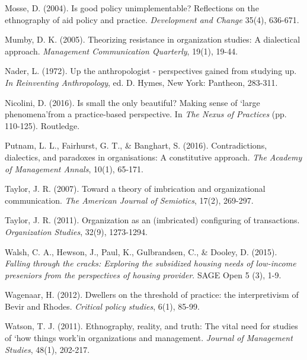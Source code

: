 \begin{thebibliography}{99}
\item Mosse, D. (2004). Is good policy unimplementable? Reflections on the ethnography of aid policy and practice. \textit{Development and Change} 35(4), 636-671.
\item Mumby, D. K. (2005). Theorizing resistance in organization studies: A dialectical approach. \textit{Management Communication Quarterly}, 19(1), 19-44.
\item Nader, L. (1972). Up the anthropologist - perspectives gained from studying up. \textit{In Reinventing Anthropology}, ed. D. Hymes, New York: Pantheon, 283-311.
\item Nicolini, D. (2016). Is small the only beautiful? Making sense of ‘large phenomena’from a practice-based perspective. In \textit{The Nexus of Practices} (pp. 110-125). Routledge.
\item Putnam, L. L., Fairhurst, G. T., \& Banghart, S. (2016). Contradictions, dialectics, and paradoxes in organisations: A constitutive approach. \textit{The Academy of Management Annals}, 10(1), 65-171.
\item Taylor, J. R. (2007). Toward a theory of imbrication and organizational communication. \textit{The American Journal of Semiotics}, 17(2), 269-297.
\item Taylor, J. R. (2011). Organization as an (imbricated) configuring of transactions. \textit{Organization Studies}, 32(9), 1273-1294.
\item Walsh, C. A., Hewson, J., Paul, K., Gulbrandsen, C., \& Dooley, D. (2015). \textit{Falling through the cracks: Exploring the subsidized housing needs of low-income preseniors from the perspectives of housing provider}. SAGE Open 5 (3), 1-9.
\item Wagenaar, H. (2012). Dwellers on the threshold of practice: the interpretivism of Bevir and Rhodes. \textit{Critical policy studies}, 6(1), 85-99.
\item Watson, T. J. (2011). Ethnography, reality, and truth: The vital need for studies of ‘how things work’in organizations and management. \textit{Journal of Management Studies}, 48(1), 202-217.

\end{thebibliography}
